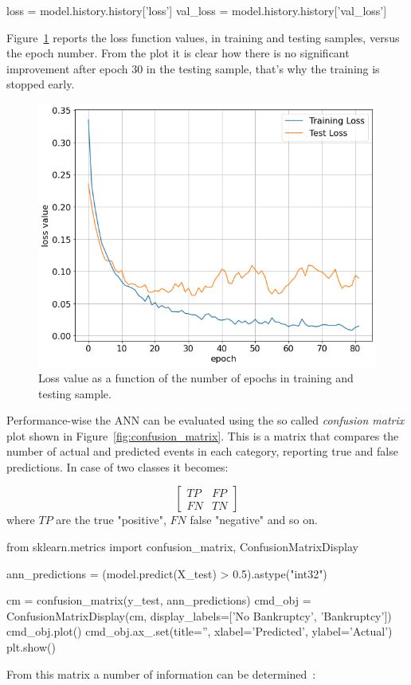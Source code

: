 \begin{ipython}
loss = model.history.history['loss']
val_loss = model.history.history['val_loss']
\end{ipython}

Figure~\ref{fig:bankruptcy_loss} reports the loss function values, in training and testing samples, versus the epoch number. From the plot it is clear how there is no significant improvement after epoch 30 in the testing sample, that's why the training is stopped early.

\begin{figure}[htbp]
\centering
\includegraphics[width=0.7\linewidth]{figures/bankruptcy_loss}
\caption{Loss value as a function of the number of epochs in training and testing sample.}
\label{fig:bankruptcy_loss}
\end{figure}

Performance-wise the ANN can be evaluated using the so called \emph{confusion matrix} plot shown in Figure~\ref{fig:confusion_matrix}. This is a matrix that compares the number of actual and predicted events in each category, reporting true and false predictions. In case of two classes it becomes:

\begin{equation*}
\begin{bmatrix}
	TP & FP \\
	FN & TN  
\end{bmatrix}
\end{equation*}
\noindent
where $TP$ are the true "positive", $FN$ false "negative" and so on.

\begin{ipython}
from sklearn.metrics import confusion_matrix, ConfusionMatrixDisplay
	
ann_predictions = (model.predict(X_test) > 0.5).astype("int32")
	
cm = confusion_matrix(y_test, ann_predictions)
cmd_obj = ConfusionMatrixDisplay(cm, display_labels=['No Bankruptcy', 'Bankruptcy'])
cmd_obj.plot()
cmd_obj.ax_.set(title='', xlabel='Predicted', ylabel='Actual')
plt.show()
\end{ipython}
\noindent
From this matrix a number of information can be determined~\cite{bib:sensitivity}:

